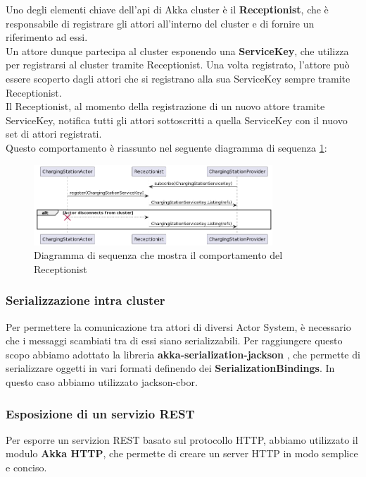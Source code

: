 Uno degli elementi chiave dell'api di Akka cluster è il \textbf{Receptionist}, che è responsabile
di registrare gli attori all'interno del cluster e di fornire un riferimento ad essi.\\

Un attore dunque partecipa al cluster esponendo una \textbf{ServiceKey}, che utilizza per registrarsi
al cluster tramite Receptionist. Una volta registrato, l'attore può essere scoperto dagli attori che
si registrano alla sua ServiceKey sempre tramite Receptionist.\\

Il Receptionist, al momento della registrazione di un nuovo attore tramite ServiceKey, notifica
tutti gli attori sottoscritti a quella ServiceKey con il nuovo set di attori registrati.\\

Questo comportamento è riassunto nel seguente diagramma di sequenza \ref{fig:cluster}:

\begin{figure}[H]
      \centering
      \includegraphics[width=0.8\textwidth]{images/cluster.png}
      \caption{Diagramma di sequenza che mostra il comportamento del Receptionist}
      \label{fig:cluster}
\end{figure}

\subsubsection{Serializzazione intra cluster}
Per permettere la comunicazione tra attori di diversi Actor System, è necessario
che i messaggi scambiati tra di essi siano serializzabili. Per raggiungere questo scopo abbiamo
adottato la libreria \textbf{akka-serialization-jackson} \cite{akkaserjack}, che permette di serializzare oggetti
in vari formati definendo dei \textbf{SerializationBindings}. In questo caso abbiamo utilizzato
jackson-cbor.

\subsubsection{Esposizione di un servizio REST}
Per esporre un servizion REST basato sul protocollo HTTP, abbiamo utilizzato il modulo \textbf{Akka HTTP},
che permette di creare un server HTTP in modo semplice e conciso.\\

